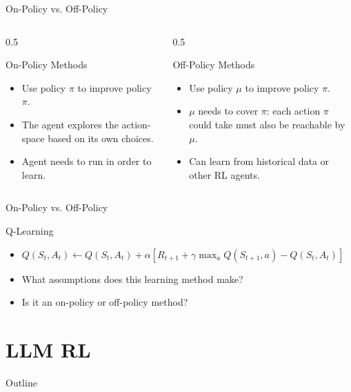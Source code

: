 \documentclass[24pt]{beamer}
\newcommand{\sectionslide}{
	\begin{frame}{Outline}
		\tableofcontents[currentsection]
	\end{frame}
}
\begin{document}
\begin{frame}{On-Policy vs. Off-Policy}
	\begin{columns}
		\begin{column}{0.5\textwidth}
			\begin{block}{On-Policy Methods}
				\begin{itemize}
					\item Use policy $\pi$ to improve policy $\pi$.
					\item The agent explores the action-space based on its own choices.
					\item \alert{Agent needs to run in order to learn}.
				\end{itemize}
			\end{block}
		\end{column}
		\begin{column}{0.5\textwidth}
			\begin{block}{Off-Policy Methods}
				\begin{itemize}
					\item Use policy $\mu$ to improve policy $\pi$.
					\item $\mu$ needs to \alert{cover} $\pi$: each action $\pi$ could take \alert{must} also be reachable by $\mu$.
					\item Can learn from historical data or other RL agents.
				\end{itemize}
			\end{block}
		\end{column}
	\end{columns}
\end{frame}

\begin{frame}{On-Policy vs. Off-Policy}
	\begin{exampleblock}{Q-Learning}
		\begin{itemize}
			\item $Q(S_t, A_t) \leftarrow Q(S_t, A_t) + \alpha \left[ R_{t+1} + \gamma \max_{a} Q(S_{t+1}, a) - Q(S_t, A_t) \right]$
			\item What assumptions does this learning method make?
			\item Is it an \alert{on-policy} or \alert{off-policy} method?
		\end{itemize}
	\end{exampleblock}
\end{frame}


\section{LLM RL}
\sectionslide
\end{document}
